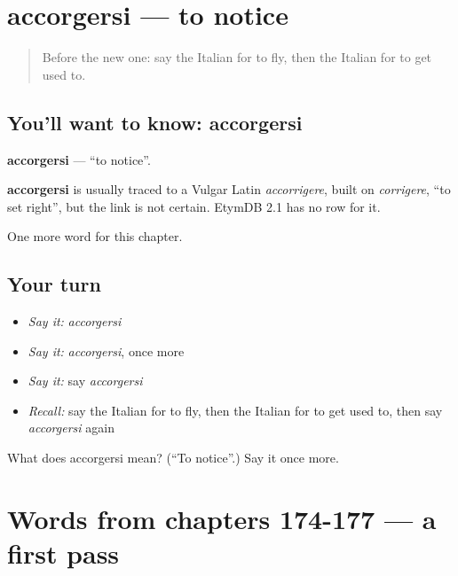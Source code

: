 \section[accorgersi]{accorgersi — to notice}

\label{lesson:IT-C182-accorgersi}



\begin{quote}
Before the new one: say the Italian for to fly, then the Italian for to get used to.
\end{quote}

\subsection*{You'll want to know: accorgersi}
\textbf{accorgersi} — \textquotedblleft{}to notice\textquotedblright{}.

\begin{cousinweb}
\textbf{accorgersi} is usually traced to a Vulgar Latin \emph{accorrigere}, built on \emph{corrigere}, \textquotedblleft{}to set right\textquotedblright{}, but the link is not certain. EtymDB 2.1 has no row for it.
\end{cousinweb}

\begin{grammarlens}[title={What you've built}]
One more word for this chapter.
\end{grammarlens}

\subsection*{Your turn}
\begin{itemize}
\raggedright
  \item \emph{Say it:} \emph{accorgersi}
  \item \emph{Say it:} \emph{accorgersi}, once more
  \item \emph{Say it:} say \emph{accorgersi}
  \item \emph{Recall:} say the Italian for to fly, then the Italian for to get used to, then say \emph{accorgersi} again
\end{itemize}

\begin{tcolorbox}[breakable,colback=teal!4,colframe=teal!35!black,title={Before you move on}]
What does accorgersi mean? (\textquotedblleft{}To notice\textquotedblright{}.) Say it once more.
\end{tcolorbox}
\section[(dialogue)]{Words from chapters 174-177 — a first pass}

